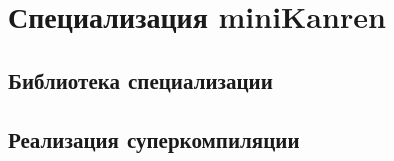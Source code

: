 \section{Специализация miniKanren}



\subsection{Библиотека специализации}



\subsection{Реализация суперкомпиляции}



